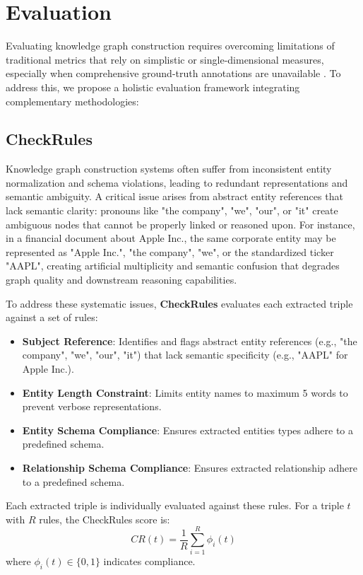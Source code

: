 \section{Evaluation} 
Evaluating knowledge graph construction requires overcoming limitations of traditional metrics that rely on simplistic or single-dimensional measures, especially when comprehensive ground-truth annotations are unavailable \citep{choi2025kgc}. To address this, we propose a holistic evaluation framework integrating complementary methodologies:

\subsection{CheckRules}
Knowledge graph construction systems often suffer from inconsistent entity normalization and schema violations, leading to redundant representations and semantic ambiguity. A critical issue arises from abstract entity references that lack semantic clarity: pronouns like "the company", "we", "our", or "it" create ambiguous nodes that cannot be properly linked or reasoned upon. For instance, in a financial document about Apple Inc., the same corporate entity may be represented as "Apple Inc.", "the company", "we", or the standardized ticker "AAPL", creating artificial multiplicity and semantic confusion that degrades graph quality and downstream reasoning capabilities.

To address these systematic issues, \textbf{CheckRules} evaluates each extracted triple against a set of rules:
\begin{itemize}
    \item \textbf{Subject Reference}: Identifies and flags abstract entity references (e.g., "the company", "we", "our", "it") that lack semantic specificity (e.g., "AAPL" for Apple Inc.).
    \item \textbf{Entity Length Constraint}: Limits entity names to maximum 5 words to prevent verbose representations.
    \item \textbf{Entity Schema Compliance}: Ensures extracted entities types adhere to a predefined schema.
    \item \textbf{Relationship Schema Compliance}: Ensures extracted relationship adhere to a predefined schema.
\end{itemize}

Each extracted triple is individually evaluated against these rules. For a triple \(t\) with \(R\) rules, the CheckRules score is:
\begin{equation}
    CR(t)=\frac{1}{R}\sum_{i=1}^{R}\phi_i(t)
\label{eq:check_rules}
\end{equation}
where \(\phi_i(t)\in\{0,1\}\) indicates compliance. 

